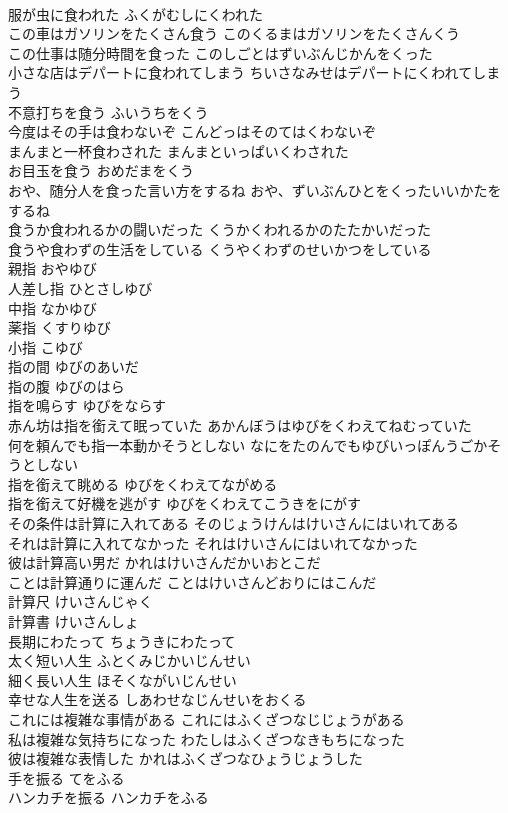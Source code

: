 \documentclass[8pt]{extreport}
\begin{document}
\begin{CJK}{UTF8}{min}
\\	服が虫に食われた	ふくがむしにくわれた	
\\	この車はガソリンをたくさん食う	このくるまはガソリンをたくさんくう	
\\	この仕事は随分時間を食った	このしごとはずいぶんじかんをくった	
\\	小さな店はデパートに食われてしまう	ちいさなみせはデパートにくわれてしまう	
\\	不意打ちを食う	ふいうちをくう	
\\	今度はその手は食わないぞ	こんどっはそのてはくわないぞ	
\\	まんまと一杯食わされた	まんまといっぱいくわされた	
\\	お目玉を食う	おめだまをくう	
\\	おや、随分人を食った言い方をするね	おや、ずいぶんひとをくったいいかたをするね	
\\	食うか食われるかの闘いだった	くうかくわれるかのたたかいだった	
\\	食うや食わずの生活をしている	くうやくわずのせいかつをしている	
\\	親指	おやゆび	
\\	人差し指	ひとさしゆび	
\\	中指	なかゆび	
\\	薬指	くすりゆび	
\\	小指	こゆび	
\\	指の間	ゆびのあいだ	
\\	指の腹	ゆびのはら	
\\	指を鳴らす	ゆびをならす	
\\	赤ん坊は指を銜えて眠っていた	あかんぼうはゆびをくわえてねむっていた	
\\	何を頼んでも指一本動かそうとしない	なにをたのんでもゆびいっぽんうごかそうとしない	
\\	指を銜えて眺める	ゆびをくわえてながめる	
\\	指を銜えて好機を逃がす	ゆびをくわえてこうきをにがす	
\\	その条件は計算に入れてある	そのじょうけんはけいさんにはいれてある	
\\	それは計算に入れてなかった	それはけいさんにはいれてなかった	
\\	彼は計算高い男だ	かれはけいさんだかいおとこだ	
\\	ことは計算通りに運んだ	ことはけいさんどおりにはこんだ	
\\	計算尺	けいさんじゃく	
\\	計算書	けいさんしょ	
\\	長期にわたって	ちょうきにわたって	
\\	太く短い人生	ふとくみじかいじんせい	
\\	細く長い人生	ほそくながいじんせい	
\\	幸せな人生を送る	しあわせなじんせいをおくる	
\\	これには複雑な事情がある	これにはふくざつなじじょうがある	
\\	私は複雑な気持ちになった	わたしはふくざつなきもちになった	
\\	彼は複雑な表情した	かれはふくざつなひょうじょうした	
\\	手を振る	てをふる	
\\	ハンカチを振る	ハンカチをふる	
\end{CJK}
\end{document}
